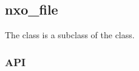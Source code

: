 %
%
%
%
%

\subsection{nxo\_file}
\label{nxo_file}

The  class is a subclass of the  class.

\subsubsection{API}
